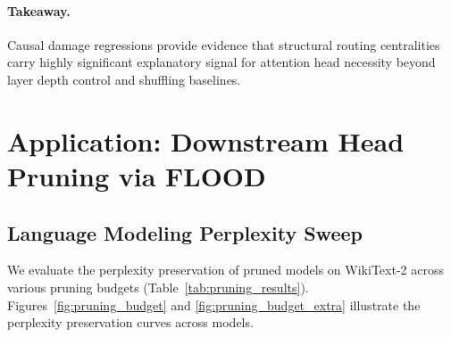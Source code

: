 \documentclass[11pt,a4paper]{article}
\theoremstyle{definition}
\theoremstyle{plain}
\begin{document}
\paragraph{Takeaway.} Causal damage regressions provide evidence that structural routing centralities carry highly significant explanatory signal for attention head necessity beyond layer depth control and shuffling baselines.

\section{Application: Downstream Head Pruning via FLOOD}
\label{sec:application}

\subsection{Language Modeling Perplexity Sweep}
We evaluate the perplexity preservation of pruned models on WikiText-2 across various pruning budgets (Table~\ref{tab:pruning_results}). Figures~\ref{fig:pruning_budget} and \ref{fig:pruning_budget_extra} illustrate the perplexity preservation curves across models.
\end{document}
